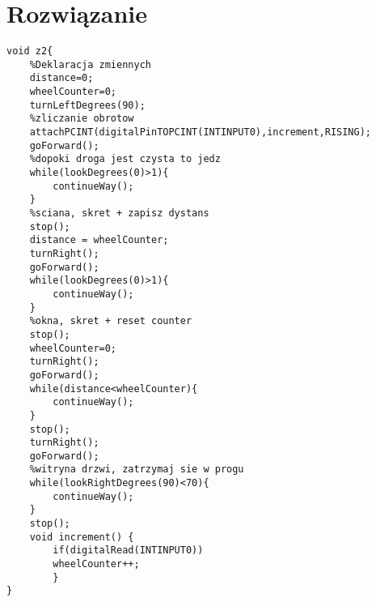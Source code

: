 \documentclass[12pt]{article}
\begin{document}
\section{Rozwiązanie}
\begin{lstlisting}
void z2{
	%Deklaracja zmiennych
	distance=0;
	wheelCounter=0;
	turnLeftDegrees(90);
	%zliczanie obrotow
	attachPCINT(digitalPinTOPCINT(INTINPUT0),increment,RISING);
	goForward();
	%dopoki droga jest czysta to jedz
	while(lookDegrees(0)>1){
		continueWay();
	}
	%sciana, skret + zapisz dystans
	stop();
	distance = wheelCounter;
	turnRight();
	goForward();
	while(lookDegrees(0)>1){
		continueWay();
	}
	%okna, skret + reset counter
	stop();
	wheelCounter=0;
	turnRight();
	goForward();
	while(distance<wheelCounter){
		continueWay();
	}
	stop();
	turnRight();
	goForward();
	%witryna drzwi, zatrzymaj sie w progu
	while(lookRightDegrees(90)<70){
		continueWay();
	}
	stop();
	void increment() {
		if(digitalRead(INTINPUT0))
		wheelCounter++;
		}
}
\end{lstlisting}
\end{document}
